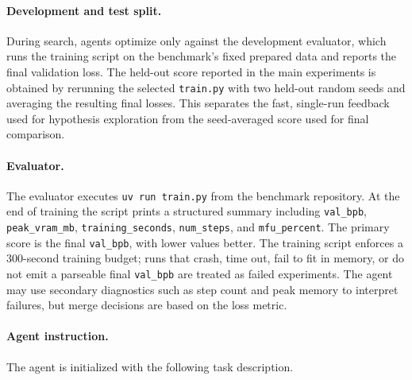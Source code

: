 \documentclass{llmxive}
\begin{document}
\paragraph{Development and test split.}
During search, agents optimize only against the development evaluator, which
runs the training script on the benchmark's fixed prepared data and reports the
final validation loss.
The held-out score reported in the main experiments is obtained by rerunning
the selected \texttt{train.py} with two held-out random seeds and averaging the
resulting final losses.
This separates the fast, single-run feedback used for hypothesis exploration
from the seed-averaged score used for final comparison.

\paragraph{Evaluator.}
The evaluator executes
\texttt{uv run train.py} from the benchmark repository.
At the end of training the script prints a structured summary including
\texttt{val\_bpb}, \texttt{peak\_vram\_mb}, \texttt{training\_seconds},
\texttt{num\_steps}, and \texttt{mfu\_percent}.
The primary score is the final \texttt{val\_bpb}, with lower values better.
The training script enforces a 300-second training budget; runs that crash,
time out, fail to fit in memory, or do not emit a parseable final
\texttt{val\_bpb} are treated as failed experiments.
The agent may use secondary diagnostics such as step count and peak memory to
interpret failures, but merge decisions are based on the loss metric.

\paragraph{Agent instruction.}
The agent is initialized with the following task description.
\end{document}
